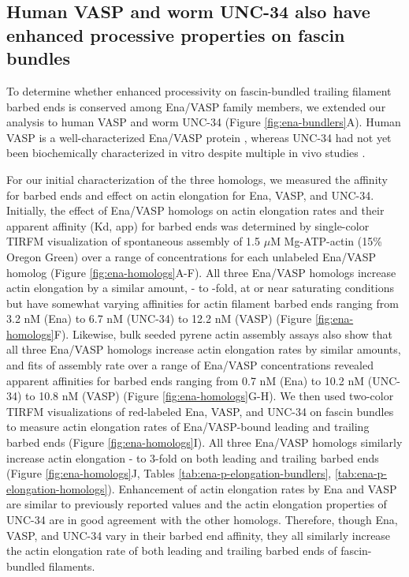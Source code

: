 \subsection{Human VASP and worm UNC-34 also have enhanced processive properties on fascin bundles}\label{vasp-unc34-processive}

To determine whether enhanced processivity on fascin-bundled trailing filament barbed ends is conserved among Ena/VASP family members, we extended our analysis to human VASP and worm UNC-34 (Figure \ref{fig:ena-bundlers}A). Human VASP is a well-characterized Ena/VASP protein \citep{bachmann_evh2_1999,chereau_understanding_2006,breitsprecher_clustering_2008,pasic_ena/vasp_2008,hansen_vasp_2010}, whereas UNC-34 had not yet been biochemically characterized in vitro despite multiple in vivo studies \citep{sheffield_c._2007,fleming_role_2010,havrylenko_wave_2015}. 

For our initial characterization of the three homologs, we measured the affinity for barbed ends and effect on actin elongation for Ena, VASP, and UNC-34. Initially, the effect of Ena/VASP homologs on actin elongation rates and their apparent affinity (Kd, app) for barbed ends was determined by single-color TIRFM visualization of spontaneous assembly of 1.5 $\mu$M Mg-ATP-actin (15\% Oregon Green) over a range of concentrations for each unlabeled Ena/VASP homolog (Figure \ref{fig:ena-homologs}A-F). All three Ena/VASP homologs increase actin elongation by a similar amount, - to -fold, at or near saturating conditions but have somewhat varying affinities for actin filament barbed ends ranging from 3.2 nM (Ena) to 6.7 nM (UNC-34) to 12.2 nM (VASP) (Figure \ref{fig:ena-homologs}F). Likewise, bulk seeded pyrene actin assembly assays also show that all three Ena/VASP homologs increase actin elongation rates by similar amounts, and fits of assembly rate over a range of Ena/VASP concentrations revealed apparent affinities for barbed ends ranging from 0.7 nM (Ena) to 10.2 nM (UNC-34) to 10.8 nM (VASP) (Figure \ref{fig:ena-homologs}G-H). We then used two-color TIRFM visualizations of red-labeled Ena, VASP, and UNC-34 on fascin bundles to measure actin elongation rates of Ena/VASP-bound leading and trailing barbed ends (Figure \ref{fig:ena-homologs}I). All three Ena/VASP homologs similarly increase actin elongation - to 3-fold on both leading and trailing barbed ends (Figure \ref{fig:ena-homologs}J, Tables \ref{tab:ena-p-elongation-bundlers}, \ref{tab:ena-p-elongation-homologs}). Enhancement of actin elongation rates by Ena and VASP are similar to previously reported values \citep{hansen_vasp_2010,winkelman_ena/vasp_2014,bruhmann_distinct_2017} and the actin elongation properties of UNC-34 are in good agreement with the other homologs. Therefore, though Ena, VASP, and UNC-34 vary in their barbed end affinity, they all similarly increase the actin elongation rate of both leading and trailing barbed ends of fascin-bundled filaments.

